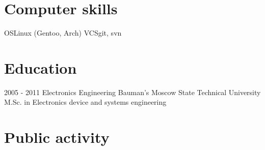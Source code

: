 \documentclass[11pt,a4paper]{moderncv}
\begin{document}
\section{Computer skills}
  \cvitem
  {OS}{Linux (Gentoo, Arch)}
  \cvitem
  {VCS}{git, svn}

\section{Education}
  \cventry
    {2005 - 2011}
    {Electronics Engineering}
    {Bauman's Moscow State Technical University}
    {}{}
    {M.Sc. in Electronics device and systems engineering}

\section{Public activity}
\end{document}
